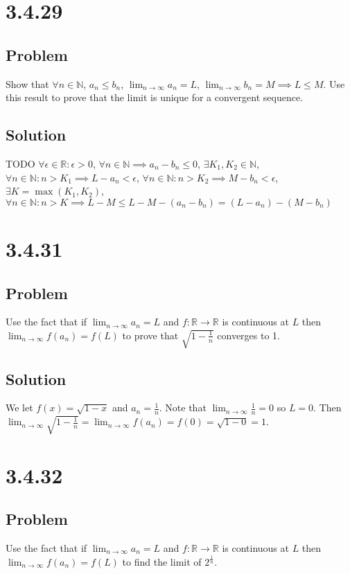 \documentclass[12pt]{article}
\newcommand{\R}    [0]{\mathbb{R}                   }
\newcommand{\N}    [0]{\mathbb{N}                   }
\begin{document}
\section*{3.4.29}

\subsection*{Problem}
Show that $\forall n \in \N$, $a_n \leq b_n$, $\lim_{n \to \infty} a_n = L$, $\lim_{n \to \infty} b_n = M \implies L \leq M$. Use this result to prove that the limit is unique for a convergent sequence.

\subsection*{Solution}
TODO
$\forall \epsilon \in \R : \epsilon > 0$, $\forall n \in \N \implies a_n - b_n \leq 0$, $\exists K_1, K_2 \in \N$, $\forall n \in \N : n > K_1 \implies L - a_n < \epsilon$, $\forall n \in \N : n > K_2 \implies M - b_n < \epsilon$, $\exists K = \max(K_1, K_2)$, $\forall n \in \N : n > K \implies L - M \leq L - M - (a_n - b_n) = (L - a_n) - (M - b_n)$



\section*{3.4.31}

\subsection*{Problem}
Use the fact that if $\lim_{n \to \infty} a_n = L$ and $f : \R \to \R$ is continuous at $L$ then $\lim_{n \to \infty} f(a_n) = f(L)$ to prove that $\sqrt{1 - \frac{1}{n}}$ converges to 1.

\subsection*{Solution}
We let $f(x) = \sqrt{1-x}$ and $a_n = \frac{1}{n}$. Note that $\lim_{n\to\infty} \frac{1}{n} = 0$ so $L = 0$. Then $\lim_{n\to\infty} \sqrt{1 - \frac{1}{n}} = \lim_{n\to\infty} f(a_n) = f(0) = \sqrt{1 - 0} = 1$.



\section*{3.4.32}

\subsection*{Problem}
Use the fact that if $\lim_{n \to \infty} a_n = L$ and $f : \R \to \R$ is continuous at $L$ then $\lim_{n \to \infty} f(a_n) = f(L)$ to find the limit of $2^\frac{1}{n}$.
\end{document}
